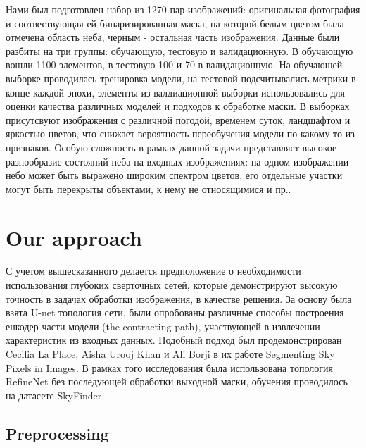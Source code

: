 \documentclass[runningheads]{llncs}
\begin{document}
Нами был подготовлен набор из 1270 пар изображений:
оригинальная фотография и соотвествующая ей бинаризированная маска, на которой белым цветом была отмечена область неба, черным - остальная часть изображения. Данные были разбиты на три группы:
обучающую, тестовую и валидационную. В обучающую вошли 1100
элементов, в тестовую 100 и 70 в валидационную. На обучающей выборке 
проводилась тренировка модели, на тестовой подсчитывались
метрики в конце каждой эпохи, элементы из валдиационной выборки
использовались для оценки качества различных моделей и подходов к
обработке маски. В выборках присутсвуют изображения с различной
погодой, временем суток, ландшафтом и яркостью цветов, что снижает 
вероятность переобучения модели по какому-то из признаков.
Особую сложность в рамках данной задачи представляет высокое 
разнообразие состояний неба на входных изображениях: на
одном изображении небо может быть выражено широким спектром
цветов, его отдельные участки могут быть перекрыты объектами, к
нему не относящимися и пр..

\section{Our approach}
С учетом вышесказанного делается предположение о необходимости 
использования глубоких сверточных сетей, которые демонстрируют 
высокую точность в задачах обработки изображения\cite{fcn}, в качестве решения. 
За основу была взята U-net топология сети, были
опробованы различные способы построения енкодер-части модели
(the contracting path), участвующей в извлечении характеристик из
входных данных.
Подобный подход был продемонстрирован Cecilia La Place, Aisha
Urooj Khan и Ali Borji в их работе Segmenting Sky Pixels in Images\cite{seg_sky}.
В рамках того исследования была использована топология RefineNet
без последующей обработки выходной маски, обучения проводилось
на датасете SkyFinder\cite{sky_seg_wild}.

\subsection{Preprocessing}
\end{document}

